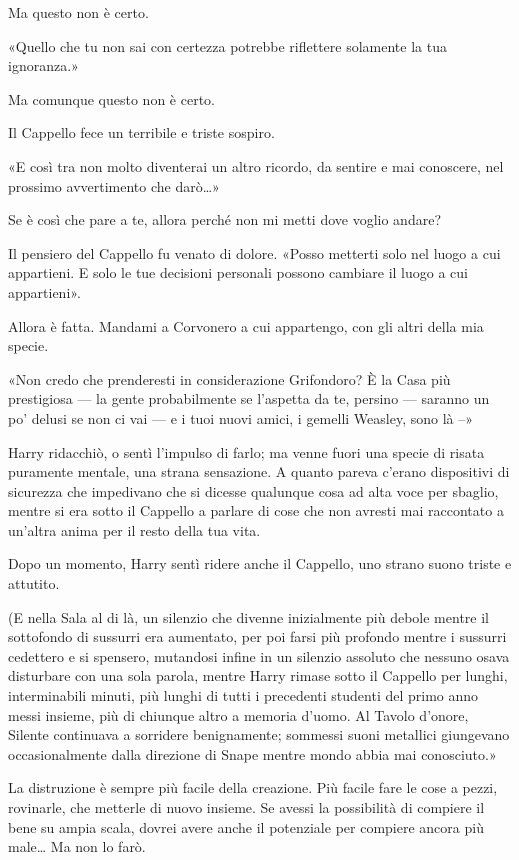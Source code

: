 Ma questo non è certo.

«Quello che tu non sai con certezza potrebbe riflettere solamente la tua ignoranza.»

Ma comunque questo non è certo.

Il Cappello fece un terribile e triste sospiro.

«E così tra non molto diventerai un altro ricordo, da sentire e mai conoscere, nel prossimo avvertimento che darò…»

Se è così che pare a te, allora perché non mi metti dove voglio andare?

Il pensiero del Cappello fu venato di dolore. «Posso metterti solo nel luogo a cui appartieni. E solo le tue decisioni personali possono cambiare il luogo a cui appartieni».

Allora è fatta. Mandami a Corvonero a cui appartengo, con gli altri della mia specie.

«Non credo che prenderesti in considerazione Grifondoro? È la Casa più prestigiosa — la gente probabilmente se l’aspetta da te, persino — saranno un po’ delusi se non ci vai — e i tuoi nuovi amici, i gemelli Weasley, sono là –»

Harry ridacchiò, o sentì l’impulso di farlo; ma venne fuori una specie di risata puramente mentale, una strana sensazione. A quanto pareva c’erano dispositivi di sicurezza che impedivano che si dicesse qualunque cosa ad alta voce per sbaglio, mentre si era sotto il Cappello a parlare di cose che non avresti mai raccontato a un’altra anima per il resto della tua vita.

Dopo un momento, Harry sentì ridere anche il Cappello, uno strano suono triste e attutito.

(E nella Sala al di là, un silenzio che divenne inizialmente più debole mentre il sottofondo di sussurri era aumentato, per poi farsi più profondo mentre i sussurri cedettero e si spensero, mutandosi infine in un silenzio assoluto che nessuno osava disturbare con una sola parola, mentre Harry rimase sotto il Cappello per lunghi, interminabili minuti, più lunghi di tutti i precedenti studenti del primo anno messi insieme, più di chiunque altro a memoria d’uomo. Al Tavolo d’onore, Silente continuava a sorridere benignamente; sommessi suoni metallici giungevano occasionalmente dalla direzione di Snape mentre mondo abbia mai conosciuto.»

La distruzione è sempre più facile della creazione. Più facile fare le cose a pezzi, rovinarle, che metterle di nuovo insieme. Se avessi la possibilità di compiere il bene su ampia scala, dovrei avere anche il potenziale per compiere ancora più male… Ma non lo farò.

